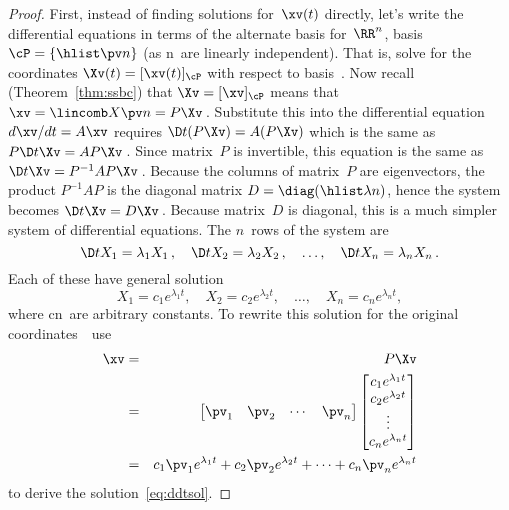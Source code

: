 \begin{proof} 
First, instead of finding solutions for~\(\xv(t)\) directly, let's write the differential equations in terms of the alternate basis for~\(\RR^n\), basis \(\cP=\{\hlist\pv n\}\) (as \hlist\pv n\ are linearly independent).
That is, solve for the coordinates \(\Xv(t)=[\xv(t)]_\cP\) with respect to basis~\cP.
Now recall (Theorem~\ref{thm:ssbc}) that  \(\Xv=[\xv]_\cP\) means that \(\xv=\lincomb X\pv n=P\Xv\)\,.
Substitute this into the differential equation \(d\xv/dt=A\xv\) requires \(\D t{}(P\Xv)=A(P\Xv)\) which is the same as \(P\D t\Xv=AP\Xv\)\,.
Since matrix~\(P\) is invertible, this equation is the same as \(\D t\Xv=P^{-1}AP\Xv\)\,.
Because the columns of matrix~\(P\) are eigenvectors, the product \(P^{-1}AP\) is the diagonal matrix \(D=\diag(\hlist\lambda n)\), hence the system becomes \(\D t\Xv=D\Xv\)\,.
Because matrix~\(D\) is diagonal, this is a much simpler system of differential equations.
The \(n\)~rows of the system are
\begin{equation*}
\D t{X_1}=\lambda_1X_1\,,\quad
\D t{X_2}=\lambda_2X_2\,,\quad \ldots,\quad
\D t{X_n}=\lambda_nX_n\,.
\end{equation*}
Each of these have general solution
\begin{equation*}
X_1=c_1e^{\lambda_1t},\quad
X_2=c_2e^{\lambda_2t},\quad \ldots,\quad
X_n=c_ne^{\lambda_nt},
\end{equation*}
where \hlist cn\ are arbitrary constants.
To rewrite this solution for the original coordinates~\xv\ use
\begin{eqnarray*}
\xv&=&P\Xv
\\&=&\begin{bmatrix} \pv_1&\pv_2&\cdots&\pv_n \end{bmatrix}
\begin{bmatrix} c_1e^{\lambda_1t}
\\c_2e^{\lambda_2t}
\\\vdots
\\c_ne^{\lambda_nt} \end{bmatrix}
\\&=&c_1\pv_1e^{\lambda_1t}+c_2\pv_2e^{\lambda_2t}+\cdots+c_n\pv_ne^{\lambda_nt}
\end{eqnarray*}
to derive the solution~\eqref{eq:ddtsol}.


\end{proof}
